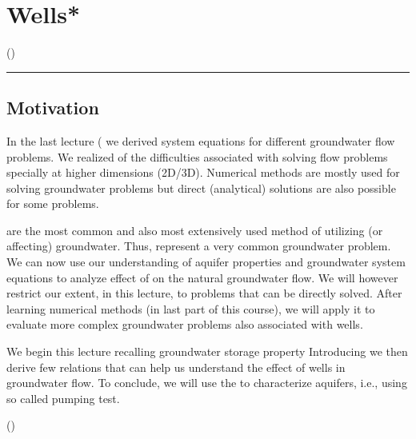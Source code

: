 \documentclass[letterpaper,10pt,english]{jupyterBook}
\begin{document}
\chapter{Wells*}
\label{\detokenize{content/flow/L8/18_wells:wells}}\label{\detokenize{content/flow/L8/18_wells::doc}}
\sphinxAtStartPar
()


\bigskip\hrule\bigskip



\section{Motivation}
\label{\detokenize{content/flow/L8/18_wells:motivation}}
\sphinxAtStartPar
In the last lecture ({\hyperref[\detokenize{content/flow/L7/17_quantify_flow::doc}]{}} we derived system equations for different groundwater flow problems. We realized of the difficulties associated with solving flow problems specially at higher dimensions (2D/3D). Numerical methods are mostly used for solving groundwater problems but direct (analytical) solutions are also possible for some problems.

\sphinxAtStartPar
{} are the most common and also most extensively used method of utilizing (or affecting) groundwater. Thus,  represent a very common groundwater problem. We can now use our understanding of aquifer properties and groundwater system equations to analyze effect of  on the natural groundwater flow. We will however restrict our extent, in this lecture, to problems that can be directly solved. After learning numerical methods (in last part of this course), we will apply it to evaluate more complex groundwater problems also associated with wells.

\sphinxAtStartPar
We begin this lecture recalling groundwater storage property  Introducing  we then derive few relations that can help us understand the effect of wells in groundwater flow. To conclude, we will use the  to characterize aquifers, i.e., using so called pumping test.

\sphinxAtStartPar
()
\end{document}
